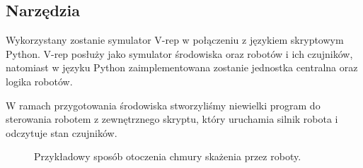 \documentclass[a4paper, 12pt]{article}
\begin{document}
		
	
	\subsection{Narzędzia}
	Wykorzystany zostanie symulator V-rep w połączeniu z językiem skryptowym Python. V-rep posłuży jako symulator środowiska oraz robotów i ich czujników, natomiast w języku Python zaimplementowana zostanie jednostka centralna oraz logika robotów.
	
	W ramach przygotowania środowiska stworzyliśmy niewielki program do sterowania robotem z zewnętrznego skryptu, który uruchamia silnik robota i odczytuje stan czujników. 
	
	\begin{figure}[h!]
	\centering
	\caption{Przykładowy sposób otoczenia chmury skażenia przez roboty.}
	\end{figure}
	


	
\end{document}
